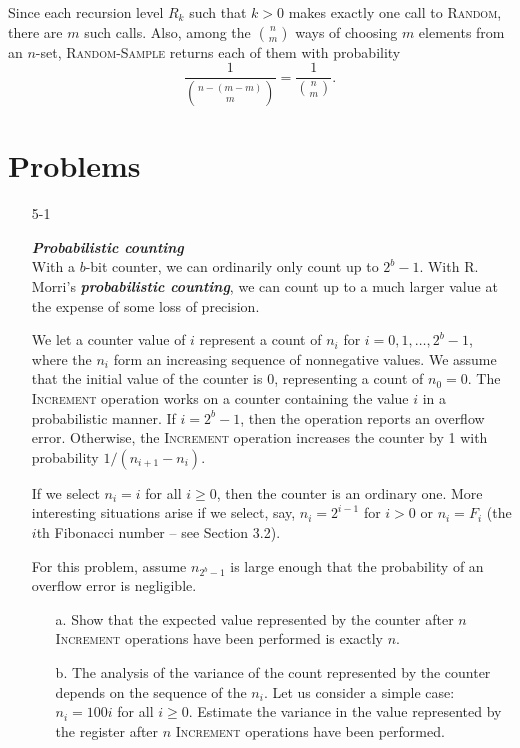 \begin{enumerate}
\begin{framed}
Since each recursion level $R_k$ such that $k > 0$ makes exactly one
call to \textsc{Random}, there are $m$ such calls. Also, among the
$\binom{n}{m}$ ways of choosing $m$ elements from an $n$-set,
\textsc{Random-Sample} returns each of them with probability
\[
  \frac{1}{\binom{n - (m - m)}{m}} = \frac{1}{\binom{n}{m}}.
\]
\end{framed}

\end{enumerate}

\newpage

\section*{Problems}
%

\begin{enumerate}
\item[5{-}1]{\textbf{\emph{Probabilistic counting}}\\
With a $b$-bit counter, we can ordinarily only count up to $2^b - 1$. With R.
Morri's \textbf{\emph{probabilistic counting}}, we can count up to a much larger
value at the expense of some loss of precision.

We let a counter value of $i$ represent a count of $n_i$ for
$i = 0, 1, \dots, 2^b - 1$, where the $n_i$ form an increasing sequence of
nonnegative values. We assume that the initial value of the counter is 0,
representing a count of $n_0 = 0$. The \textsc{Increment} operation works on
a counter containing the value $i$ in a probabilistic manner. If $i = 2^b - 1$,
then the operation reports an overflow error. Otherwise, the \textsc{Increment}
operation increases the counter by 1 with probability $1/(n_{i + 1} - n_i)$.

If we select $n_i = i$ for all $i \ge 0$, then the counter is an ordinary one.
More interesting situations arise if we select, say, $n_i = 2^{i - 1}$ for
$i > 0$ or $n_i = F_i$ (the $i$th Fibonacci number {--} see Section 3.2).

For this problem, assume $n_{2^b - 1}$ is large enough that the probability of
an overflow error is negligible.

\begin{enumerate}
\item[a.] Show that the expected value represented by the counter after $n$
\textsc{Increment} operations have been performed is exactly $n$.
\item[b.] The analysis of the variance of the count represented by the counter
depends on the sequence of the $n_i$. Let us consider a simple case:
$n_i = 100i$ for all $i \ge 0$. Estimate the variance in the value represented
by the register after $n$ \textsc{Increment} operations have been performed.
\end{enumerate}
}


\end{enumerate}
